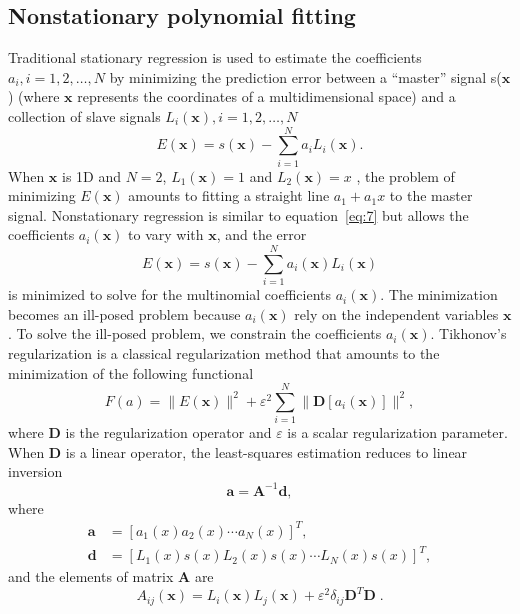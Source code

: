\subsection{Nonstationary polynomial fitting}
Traditional stationary regression is used to estimate the coefficients
$a_{i}, i=1,2,\dots,N$ by minimizing the prediction error between a
``master'' signal s($\mathbf{x}$) (where $\mathbf{x}$ represents the
coordinates of a multidimensional space) and a collection of slave
signals $L_{i}(\mathbf{x}), i = 1, 2,\dots ,N$
\cite[]{Fomel09}
\begin{equation}
  \label{eq:7}
  E(\mathbf{x})=s(\mathbf{x})-\sum_{i=1}^{N}a_{i}L_{i}(\mathbf{x}).
\end{equation}
When $\mathbf{x}$ is 1D and $N= 2$, $L_{1}(\mathbf{x})=1$ and
$L_{2}(\mathbf{x})=x$ , the problem of minimizing $E(\mathbf{x})$
amounts to fitting a straight line $a_{1}+a_{1}x$ to the master
signal.  Nonstationary regression is similar to equation~\ref{eq:7}
but allows the coefficients $a_{i}(\mathbf{x})$ to vary with
$\mathbf{x}$, and the error
\cite[]{Fomel09}
\begin{equation}
  \label{eq:8}
  E(\mathbf{x})=s(\mathbf{x})-\sum_{i=1}^{N}a_{i}(\mathbf{x})L_{i}(\mathbf{x})
\end{equation}
is minimized to solve for the multinomial coefficients $a_{i}(\mathbf{x})$. The
minimization becomes an ill-posed problem because $a_{i}(\mathbf{x})$ rely on
the independent variables $\mathbf{x}$. To solve the ill-posed problem, we
constrain the coefficients $a_{i}(\mathbf{x})$. Tikhonov's regularization
\cite[]{Tikhonov63} is a classical regularization method that amounts
to the minimization of the following functional \cite[]{Fomel09}
\begin{equation}
  \label{eq:9}
  F(a)=\|E(\mathbf{x})\|^{2}+
    \varepsilon^{2}\sum_{i=1}^{N}\|\mathbf{D}[a_{i}(\mathbf{x})]\|^2 ,
\end{equation}
where $\mathbf{D}$ is the regularization operator and $\varepsilon$ is
a scalar regularization parameter. When $\mathbf{D}$ is a linear
operator, the least-squares estimation reduces to linear inversion
\cite[]{Fomel09}
\begin{equation}
  \label{eq:10}
  \mathbf{a}=\mathbf{A}^{-1}\mathbf{d} ,
\end{equation}
where
\begin{equation}
\begin{split}
  \nonumber
  \mathbf{a} & =[a_1(x)a_2(x)\cdots a_N(x)]^T ,\\
  \nonumber
  \mathbf{d} & =[L_1(x)s(x)L_2(x)s(x)\cdots L_N(x)s(x)]^T,
\end{split}
\end{equation}
and the elements of matrix $\mathbf{A}$ are
\begin{equation}
  \nonumber 
  A_{ij}({\mathbf{x}})=L_i({\mathbf{x}})L_j({\mathbf{x}})+\varepsilon^2
         \delta_{ij}\mathbf{D}^T\mathbf{D} \;.
\end{equation}

